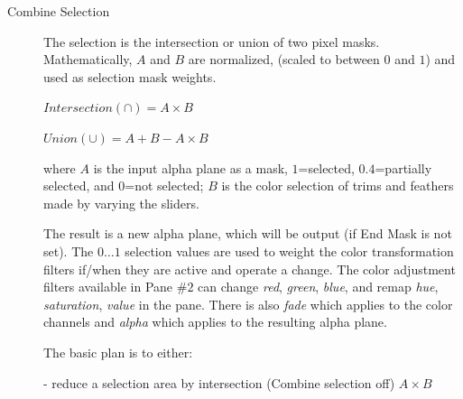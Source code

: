 \begin{description}
    \item[Combine Selection] The selection is the intersection or union of two pixel masks. Mathematically, $A$ and $B$ are normalized, (scaled to between $0$ and $1$) and used as selection mask weights.
    
    $Intersection (\cap) = A\times B$
    
    $Union (\cup)= A+B-A\times B$
    
    where $A$ is the input alpha plane as a mask, $1$=selected, $0.4$=partially selected, and $0$=not selected; $B$ is the color selection of trims and feathers made by varying the sliders.
    
    The result is a new alpha plane, which will be output (if End Mask is not set). The $0\dots1$ selection values are used to weight the color transformation filters if/when they are active and operate a change. The color adjustment filters available in Pane \#$2$ can change \textit{red}, \textit{green}, \textit{blue}, and remap \textit{hue}, \textit{saturation}, \textit{value} in the pane. There is also \textit{fade} which applies to the color channels and \textit{alpha} which applies to the resulting alpha plane.
    
    The basic plan is to either:
    
    - reduce a selection area by intersection (Combine selection off) $A \times B$
    

\end{description}
